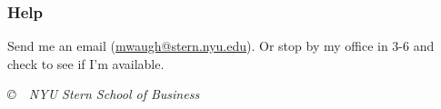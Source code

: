 \documentclass[12pt,pdftex,twoside,letterpaper]{exam}
\begin{document}
\subsubsection*{Help}

Send me an email (\href{mailto:mwaugh@stern.nyu.edu}{mwaugh@stern.nyu.edu}). Or stop by my office in 3-6 and check to see if I'm available.




\vfill \centerline{\it \copyright \ \number\year \
NYU Stern School of Business}
\end{document}
